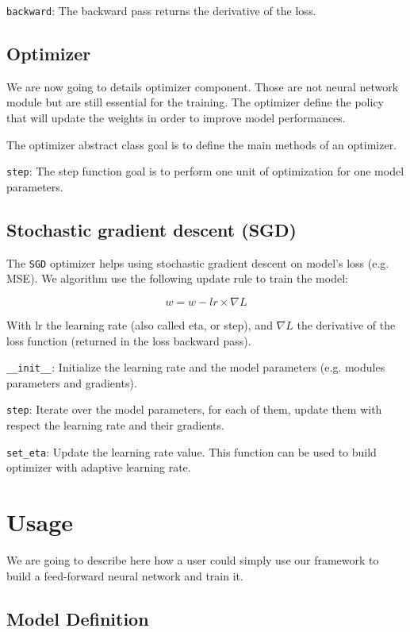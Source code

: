 \documentclass[10pt,conference,compsocconf]{IEEEtran}
\begin{document}
\texttt{backward}: The backward pass returns the derivative of the loss. 

\subsection{Optimizer}

We are now going to details optimizer component. Those are not neural network module but are still essential for the training. The optimizer define the policy that will update the weights in order to improve model performances. 

The optimizer abstract class goal is to define the main methods of an optimizer. 

\texttt{step}: The step function goal is to perform one unit of optimization for one model parameters. 


\subsection{Stochastic gradient descent (SGD)}

The \texttt{SGD} optimizer helps using stochastic gradient descent on model's loss (e.g. MSE). We algorithm use the following update rule to train the model:

\begin{equation}
    w = w - lr \times \nabla L
\end{equation}

With lr the learning rate (also called eta, or step), and $\nabla L$ the derivative of the loss function (returned in the loss backward pass). 

\texttt{\_\_init\_\_}: Initialize the learning rate and the model parameters (e.g. modules parameters and gradients).

\texttt{step}: Iterate over the model parameters, for each of them, update them with respect the learning rate and their gradients.

\texttt{set\_eta}: Update the learning rate value. This function can be used to build optimizer with adaptive learning rate.

\section{Usage}

We are going to describe here how a user could simply use our framework to build a feed-forward neural network and train it. 

\subsection{Model Definition}
\end{document}
